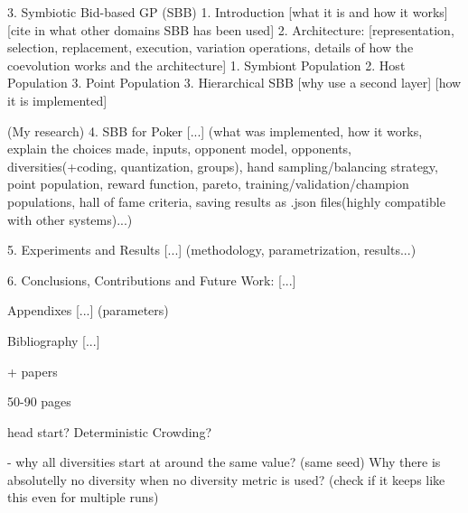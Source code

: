 3. Symbiotic Bid-based GP (SBB)
    1. Introduction
        [what it is and how it works]
        [cite in what other domains SBB has been used]
    2. Architecture: [representation, selection, replacement, execution, variation operations, details of how the coevolution works and the architecture]
        1. Symbiont Population
        2. Host Population
        3. Point Population        
    3. Hierarchical SBB
        [why use a second layer]
        [how it is implemented]

(My research)
4. SBB for Poker
[...] (what was implemented, how it works, explain the choices made, inputs, opponent model, opponents, diversities(+coding, quantization, groups), hand sampling/balancing strategy, point population, reward function, pareto, training/validation/champion populations, hall of fame criteria, saving results as .json files(highly compatible with other systems)...)

5. Experiments and Results
[...] (methodology, parametrization, results...)

6. Conclusions, Contributions and Future Work:
[...]

Appendixes
[...] (parameters)

Bibliography
[...]


+ papers

50-90 pages

head start?
Deterministic Crowding?


- why all diversities start at around the same value? (same seed) Why there is absolutelly no diversity when no diversity metric is used? (check if it keeps like this even for multiple runs)